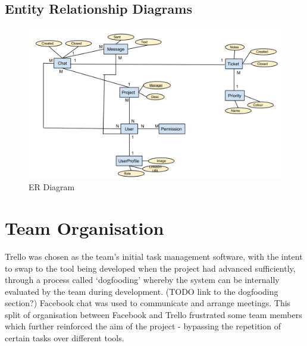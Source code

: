 \documentclass[a4paper]{l3proj}
\begin{document}



\par
\par
\section{Entity Relationship Diagrams}

\begin{figure}[ht]
\centering
\includegraphics[scale=0.4]{ER_Diagram}
\caption{ER Diagram}
\end{figure}

\chapter{Team Organisation}
\label{team}

Trello was chosen as the team’s initial task management software, with the intent to swap to the tool being developed when the project had advanced sufficiently, through a process called ‘dogfooding’ whereby the system can be internally evaluated by the team during development. (TODO link to the dogfooding section?)  Facebook chat was used to communicate and arrange meetings.  This split of organisation between Facebook and Trello frustrated some team members which further reinforced the aim of the project - bypassing the repetition of certain tasks over different tools. 
\end{document}
